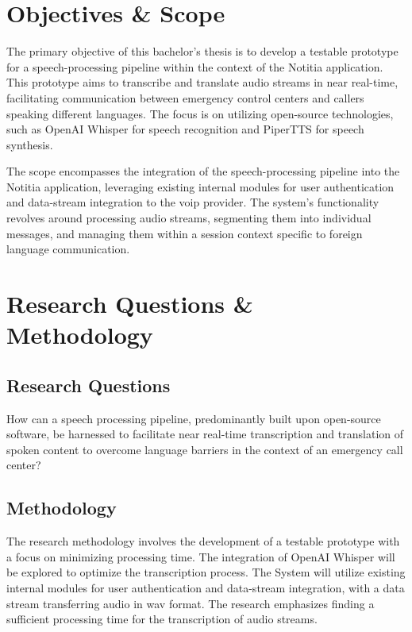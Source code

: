 
\section{Objectives \& Scope}

The primary objective of this bachelor's thesis is to develop a testable prototype for a speech-processing pipeline 
within the context of the Notitia application. This prototype aims to transcribe and translate audio streams in near 
real-time, facilitating communication between emergency control centers and callers speaking different languages. The 
focus is on utilizing open-source technologies, such as OpenAI Whisper for speech recognition and PiperTTS for 
speech synthesis.

The scope encompasses the integration of the speech-processing pipeline into the Notitia application, leveraging 
existing internal modules for user authentication and data-stream integration to the \ac{voip} provider. The 
system's functionality revolves around processing audio streams, segmenting them into individual messages, and managing 
them within a session context specific to foreign language communication.


\section{Research Questions \& Methodology}

\subsection{Research Questions}

How can a speech processing pipeline, predominantly built upon open-source software, be harnessed to facilitate near 
real-time transcription and translation of spoken content to overcome language barriers in the context of an emergency 
call center?

\subsection{Methodology}

The research methodology involves the development of a testable prototype with a focus on minimizing processing time. 
The integration of OpenAI Whisper will be explored to optimize the transcription process. The System will utilize 
existing internal modules for user authentication and data-stream integration, with a data stream transferring audio 
in \ac{wav} format. The research emphasizes finding a sufficient processing time for the transcription of audio streams.

